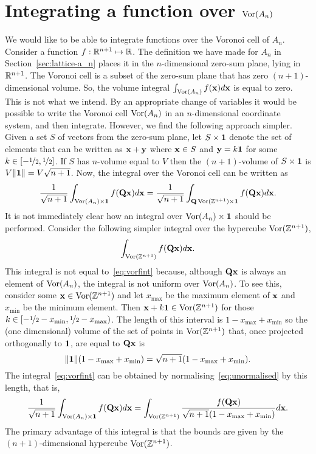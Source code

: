 \documentclass[journal, onecolumn, 11pt]{IEEEtran}
\begin{document}
\section{Integrating a function over $\operatorname{Vor}(A_n)$}\label{sec:integr-funct-over}

We would like to be able to integrate functions over the Voronoi cell of $A_n$.  Consider a function $f : {\mathbb R}^{n+1} \mapsto {\mathbb R}$.  The definition we have made for $A_n$ in Section~\ref{sec:lattice-a_n} places it in the $n$-dimensional zero-sum plane, lying in ${\mathbb R}^{n+1}$.  The Voronoi cell is a subset of the zero-sum plane that has zero $(n+1)$-dimensional volume.  So, the volume integral $\int_{\operatorname{Vor}(A_n)} f(\mathbf{x}) d \mathbf{x}$ is equal to zero.  This is not what we intend.  By an appropriate change of variables it would be possible to write the Voronoi cell $\operatorname{Vor}(A_n)$ in an $n$-dimensional coordinate system, and then integrate.  However, we find the following approach simpler.  Given a set $S$ of vectors from the zero-sum plane, let $S \times \boldsymbol{1}$ denote the set of elements that can be written as $\mathbf{x} + \mathbf{y}$ where $\mathbf{x} \in S$ and $\mathbf{y} = k\boldsymbol{1}$ for some $k \in [-\nicefrac{1}{2},\nicefrac{1}{2}]$.  If $S$ has $n$-volume equal to $V$ then the $(n+1)$-volume of $S\times\boldsymbol{1}$ is $V\|\boldsymbol{1}\| = V \sqrt{n+1}$.  Now, the integral over the Voronoi cell can be written as
\begin{equation}\label{eq:vorfint}
\frac{1}{\sqrt{n+1}} \int_{\vor(A_n) \times \onebf} f(\Qbf\xbf) d\xbf = \frac{1}{\sqrt{n+1}} \int_{\Qbf\vor(\ints^{n+1}) \times \onebf} f(\Qbf\xbf) d\xbf.
\end{equation}
It is not immediately clear how an integral over $\operatorname{Vor}(A_n) \times \boldsymbol{1}$ should be performed.  Consider the following simpler integral over the hypercube $\operatorname{Vor}({\mathbb Z}^{n+1})$,
\begin{equation}\label{eq:unormalised}
\int_{\vor(\ints^{n+1})} f(\Qbf\xbf) d\xbf.
\end{equation}
This integral is not equal to~\eqref{eq:vorfint} because, although $\mathbf{Q}\mathbf{x}$ is always an element of $\operatorname{Vor}(A_n)$, the integral is not uniform over $\operatorname{Vor}(A_n)$.  To see this, consider some $\mathbf{x} \in \operatorname{Vor}({\mathbb Z}^{n+1})$ and let $x_{\text{max}}$ be the maximum element of $\mathbf{x}$ and $x_{\text{min}}$ be the minimum element.  Then $\mathbf{x} +  k \boldsymbol{1} \in \operatorname{Vor}({\mathbb Z}^{n+1})$ for those $k \in [-\nicefrac{1}{2} - x_{\text{min}}, \nicefrac{1}{2} - x_{\text{max}})$.  The length of this interval is $1 - x_{\text{max}} + x_{\text{min}}$ so the (one dimensional) volume of the set of points in $\operatorname{Vor}({\mathbb Z}^{n+1})$ that, once projected orthogonally to $\boldsymbol{1}$, are equal to $\mathbf{Q}\mathbf{x}$ is
\[
\|\boldsymbol{1}\|(1 - x_{\text{max}} + x_{\text{min}}) = \sqrt{n+1}(1 - x_{\text{max}} + x_{\text{min}}).
\]
The integral~\eqref{eq:vorfint} can be obtained by normalising~\eqref{eq:unormalised} by this length, that is,
\begin{equation}\label{eq:vorfintafternorm}
\frac{1}{\sqrt{n+1}} \int_{\vor(A_n) \times \onebf} f(\Qbf\xbf) d\xbf =  \int_{\vor(\ints^{n+1})} \frac{f(\Qbf\xbf)}{\sqrt{n+1}(1 - x_{\text{max}} + x_{\text{min}})}  d\xbf.
\end{equation}
The primary advantage of this integral is that the bounds are given by the $(n+1)$-dimensional hypercube $\operatorname{Vor}({\mathbb Z}^{n+1})$.
\end{document}
